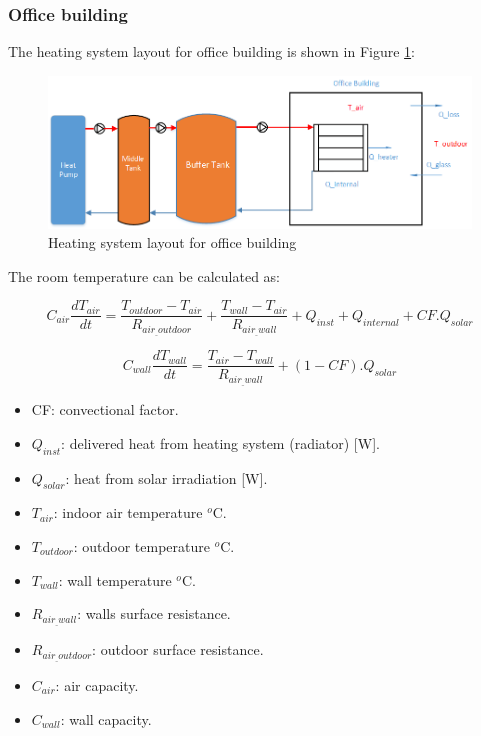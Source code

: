 \subsubsection{Office building}

The heating system layout for office building is shown in Figure \ref{fig:officeheatinglayout}:

\begin{figure}[ht]
\centering
\includegraphics[width=1\columnwidth]{pictures/Office_diagram.png}
\caption[Short title]{Heating system layout for office building}
\label{fig:officeheatinglayout}\end{figure}

The room temperature can be calculated as:

\begin{equation}
C_{air}\frac{dT_{air}}{dt}=\frac{T_{outdoor}-T_{air}}{R_{air_{\_}outdoor}} + \frac{T_{wall}-T_{air}}{R_{air_{\_}wall}} + Q_{inst} + Q_{internal} + CF.Q_{solar}
\end{equation}

\begin{equation}
C_{wall}\frac{dT_{wall}}{dt}=\frac{T_{air}-T_{wall}}{R_{air_{\_}wall}} + (1-CF).Q_{solar}
\end{equation}

 \begin{itemize}
      \item CF: convectional factor.
      \item $Q_{inst}$: delivered heat from heating system (radiator) [W].
      \item $Q_{solar}$: heat from solar irradiation [W].
      \item $T_{air}$: indoor air temperature $^o$C.
      \item $T_{outdoor}$: outdoor temperature $^o$C.
      \item $T_{wall}$: wall temperature $^o$C.
      \item $R_{air_{\_}wall}$: walls surface resistance.
      \item $R_{air_{\_}outdoor}$: outdoor surface resistance.
      \item $C_{air}$: air capacity.
      \item $C_{wall}$: wall capacity.
    \end{itemize}
    


